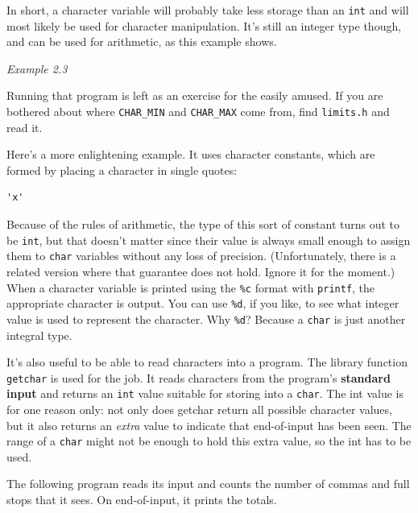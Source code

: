   In short, a character variable will probably take less storage than an
    \texttt{int} and will most likely be used for character manipulation.
    It's still an integer type though, and can be used for arithmetic, as this
    example shows.


   \begin{center}\textit{Example 2.3}\end{center}


   Running that program is left as an exercise for the easily amused. If
    you are bothered about where \texttt{CHAR\_MIN} and
    \texttt{CHAR\_MAX} come from, find \texttt{limits.h} and read
    it.


   Here's a more enlightening example. It uses character constants, which
    are formed by placing a character in single quotes:


   \begin{Verbatim}
'x'
\end{Verbatim}

   Because of the rules of arithmetic, the type of this sort of constant
    turns out to be \texttt{int}, but that doesn't matter since their
    value is always small enough to assign them to \texttt{char} variables
    without any loss of precision. (Unfortunately, there is a related version
    where that guarantee does not hold. Ignore it for the moment.) When a
    character variable is printed using the \texttt{\%c} format with
    \texttt{printf}, the appropriate character is output. You can use
    \texttt{\%d}, if you like, to see what integer value is used to
    represent the character. Why \texttt{\%d}? Because a \texttt{char}
    is just another integral type.


   It's also useful to be able to read characters into a program. The
    library function \texttt{getchar} is used for the job. It reads
    characters from the program's \textbf{standard input} and returns an
    \texttt{int} value suitable for storing into a \texttt{char}. The
    int value is for one reason only: not only does getchar return all
    possible character values, but it also returns an \textit{extra} value to
    indicate that end-of-input has been seen. The range of a \texttt{char}
    might not be enough to hold this extra value, so the int has to be
    used.


   The following program reads its input and counts the number of commas
    and full stops that it sees. On end-of-input, it prints the totals.


